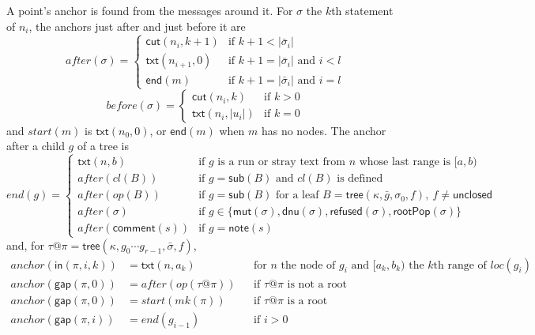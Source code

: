 \documentclass[11pt]{article}
\numberwithin{equation}{section}
\newcommand{\kw}[1]{\ensuremath{\mathsf{#1}}}
\begin{document}
A point's anchor is found from the messages around it.  For $\sigma$ the
$k$th statement of $n_i$, the anchors just after and just before it are
\begin{equation}\label{eq:anchor-after}
\mathit{after}(\sigma) =
\begin{cases}
\kw{cut}(n_i, k{+}1) & \text{if } k + 1 < |\bar\sigma_i| \\
\kw{txt}(n_{i+1}, 0) & \text{if } k + 1 = |\bar\sigma_i| \text{ and } i < l \\
\kw{end}(m) & \text{if } k + 1 = |\bar\sigma_i| \text{ and } i = l
\end{cases}
\end{equation}
\begin{equation}\label{eq:anchor-before}
\mathit{before}(\sigma) =
\begin{cases}
\kw{cut}(n_i, k) & \text{if } k > 0 \\
\kw{txt}(n_i, |u_i|) & \text{if } k = 0
\end{cases}
\end{equation}
and $\mathit{start}(m)$ is $\kw{txt}(n_0, 0)$, or $\kw{end}(m)$ when $m$ has
no nodes.  The anchor after a child $g$ of a tree is
\begin{equation}\label{eq:anchor-end}
\mathit{end}(g) =
\begin{cases}
\kw{txt}(n, b) & \text{if } g \text{ is a run or stray text from } n
  \text{ whose last range is } [a, b) \\
\mathit{after}(\mathit{cl}(B)) & \text{if } g = \kw{sub}(B) \text{ and } \mathit{cl}(B)
  \text{ is defined} \\
\mathit{after}(\mathit{op}(B)) & \text{if } g = \kw{sub}(B) \text{ for a leaf }
  B = \kw{tree}(\kappa, \bar g, \sigma_0, f),\ f \neq \kw{unclosed} \\
\mathit{after}(\sigma) & \text{if } g \in \{\kw{mut}(\sigma),
  \kw{dnu}(\sigma), \kw{refused}(\sigma), \kw{rootPop}(\sigma)\} \\
\mathit{after}(\kw{comment}(s)) & \text{if } g = \kw{note}(s)
\end{cases}
\end{equation}
and, for $\tau@\pi = \kw{tree}(\kappa, g_0 \cdots g_{r-1}, \bar\sigma, f)$,
\begin{equation}\label{eq:anchor-point}
\begin{aligned}
\mathit{anchor}(\kw{in}(\pi, i, k)) &= \kw{txt}(n, a_k)
  && \text{for } n \text{ the node of } g_i \text{ and } [a_k, b_k)
     \text{ the } k\text{th range of } \mathit{loc}(g_i) \\
\mathit{anchor}(\kw{gap}(\pi, 0)) &= \mathit{after}(\mathit{op}(\tau@\pi))
  && \text{if } \tau@\pi \text{ is not a root} \\
\mathit{anchor}(\kw{gap}(\pi, 0)) &= \mathit{start}(\mathit{mk}(\pi))
  && \text{if } \tau@\pi \text{ is a root} \\
\mathit{anchor}(\kw{gap}(\pi, i)) &= \mathit{end}(g_{i-1})
  && \text{if } i > 0
\end{aligned}
\end{equation}
\end{document}
